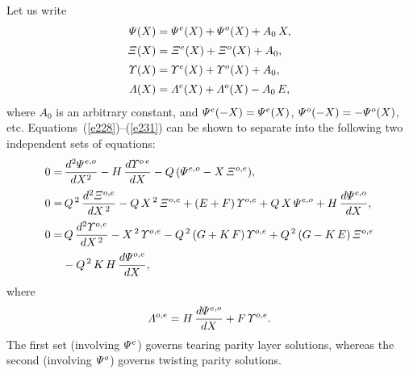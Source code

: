 \documentclass[12pt,prb,aps,notitlepage]{revtex4-1}
\begin{document}
Let us write
\begin{align}
{\mit\Psi}(X) &= {\mit\Psi}^e(X) + {\mit\Psi}^o(X) + A_0\,X,\\[0.5ex]
{\mit\Xi}(X) &= {\mit\Xi}^e(X) + {\mit\Xi}^o(X) + A_0,\\[0.5ex]
{\mit\Upsilon}(X) &= {\mit\Upsilon}^e(X) + {\mit\Upsilon}^o(X) + A_0,\\[0.5ex]
{\mit\Lambda}(X) &= {\mit\Lambda}^e(X) + {\mit\Lambda}^o(X) - A_0\,E,
\end{align}
where $A_0$ is an arbitrary constant, and ${\mit\Psi}^e(-X)={\mit\Psi}^e(X)$, ${\mit\Psi}^o(-X) = -{\mit\Psi}^o(X)$, etc.
Equations~(\ref{e228})--(\ref{e231}) can be shown to separate into the following two independent sets of equations:
\begin{align}\label{e245}
0=&\, \frac{d^2{\mit\Psi}^{e,o}}{dX^2} - H\,\frac{d{\mit\Upsilon}^{o\,e}}{dX} - Q\,({\mit\Psi}^{e,o}-X\,{\mit\Xi}^{o,e}),\\[0.5ex]
0=&\, Q^{\,2}\,\frac{d^2{\mit\Xi}^{o,e}}{dX^{\,2}} - Q\,X^{\,2}\,{\mit\Xi}^{o,e} + (E+F)\,{\mit\Upsilon}^{o,e}
+ Q\,X\,{\mit\Psi}^{e,o}+ H\,\frac{d{\mit\Psi}^{e,o}}{dX},\\[0.5ex]
0=&\, Q\,\frac{d^2{\mit\Upsilon}^{o,e}}{dX^{\,2}} - X^{\,2}\,{\mit\Upsilon}^{o,e} - Q^{\,2}\,(G+K\,F)\,{\mit\Upsilon}^{o,e}
+ Q^{\,2}\,(G-K\,E)\,{\mit\Xi}^{o,e}\nonumber\\[0.5ex]
&- Q^{\,2}\,K\,H\,\frac{d{\mit\Psi}^{o,e}}{dX},
\end{align}
where
\begin{equation}
{\mit\Lambda}^{o,e} =H\,\frac{d{\mit\Psi}^{e,o}}{dX} + F\,{\mit\Upsilon}^{o,e}.\label{e247}
\end{equation}
The first set (involving ${\mit\Psi}^e$) governs tearing parity layer solutions, whereas  the second (involving ${\mit\Psi}^o$)
governs twisting parity solutions. 
\end{document}

